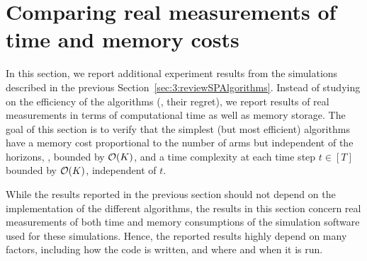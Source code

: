 




\section{Comparing real measurements of time and memory costs}
\label{sec:3:timeAndMemoryCosts}



In this section, we report additional experiment results from the simulations described in the previous Section~\ref{sec:3:reviewSPAlgorithms}.
Instead of studying on the efficiency of the algorithms (\ie, their regret), we report results of real measurements in terms of computational time as well as memory storage.
%
The goal of this section is to verify that the simplest (but most efficient) algorithms have a memory cost proportional to the number of arms but independent of the horizons, \ie, bounded by $\mathop{}\mathopen{}\mathcal{O}\mathopen{}\left(K\right)$, and a time complexity at each time step $t\in[T]$ bounded by $\mathop{}\mathopen{}\mathcal{O}\mathopen{}\left(K\right)$, independent of $t$.

While the results reported in the previous section should not depend on the implementation of the different algorithms, the results in this section concern real measurements of both time and memory consumptions of the simulation software used for these simulations.
Hence, the reported results highly depend on many factors, including how the code is written, and where and when it is run.

